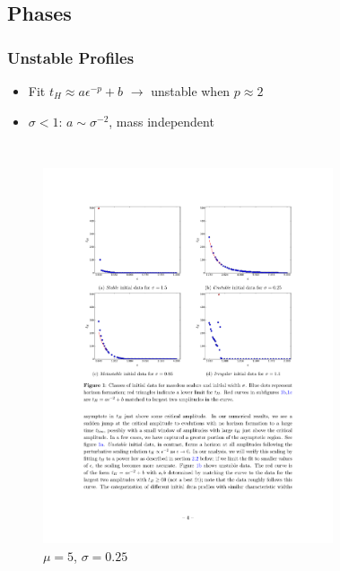 \documentclass[mathserif,10pt]{beamer}
\newcommand{\bi}{\begin{itemize}}
\newcommand{\ei}{\end{itemize}}
\newcommand{\its}{\item}
\begin{document}

\subsection{Phases}
\frame
{
  \frametitle{Unstable Profiles}
    \bi
    \its Fit $t_H \approx a \epsilon^{-p} + b$ $\to$ unstable when $p \approx 2$
    \its<2->{$\sigma < 1$: $a \sim \sigma^{-2}$, mass independent}
    \ei
    \begin{columns}
      \begin{figure}
      \centering
      \includegraphics[scale=0.75]{m0w025} \\ $\mu = 5$, $\sigma=0.25$
      \end{figure}
      \begin{figure}
      \centering
      \hspace{-0.2in}
      \vspace{0.2in}

\end{figure}
\end{columns}}
\end{document}
